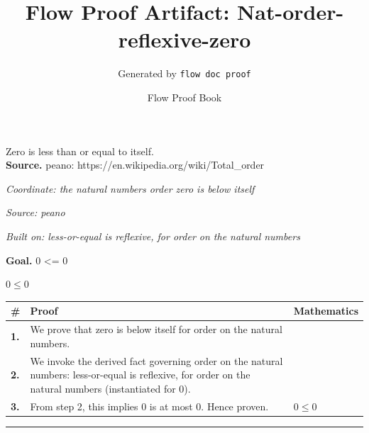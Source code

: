 \documentclass[11pt]{article}
\title{Flow Proof Artifact: Nat-order-reflexive-zero}
\author{Generated by \texttt{flow doc proof}}
\date{Flow Proof Book}
\theoremstyle{definition}
\begin{document}
\maketitle
Zero is less than or equal to itself.\\[0.5em]
\textbf{Source.} peano: https://en.wikipedia.org/wiki/Total\_order\\[0.5em]
\bigskip
{}\par
\smallskip\noindent\textit{Coordinate: the natural numbers \cdot order \cdot zero is below itself}\par
\smallskip\noindent\textit{Source: peano}\par
\smallskip\noindent\textit{Built on: less-or-equal is reflexive, for order on the natural numbers}\par
\medskip
\noindent\textbf{Goal.} 0 <= 0\par
\noindent$\displaystyle 0 \le 0$\par
\medskip
\noindent
\begin{tabular}{@{} >{\raggedright\arraybackslash}p{} >{\raggedright\arraybackslash}p{} >{\raggedleft\arraybackslash}p{} @{}}
\textbf{\#} & \textbf{Proof} & \textbf{Mathematics} \\
\midrule
\textbf{1.} & We prove that zero is below itself for order on the natural numbers. & \\[0.45em]
\textbf{2.} & We invoke the derived fact governing order on the natural numbers: less-or-equal is reflexive, for order on the natural numbers (instantiated for 0). & \\[0.45em]
\textbf{3.} & From step 2, this implies 0 is at most 0. Hence proven. & $\displaystyle 0 \le 0$ \\[0.45em]
\bottomrule
\end{tabular}
\label{thm:Nat-order-zero_is_below_itself}
\par\medskip\hrule
\end{document}
